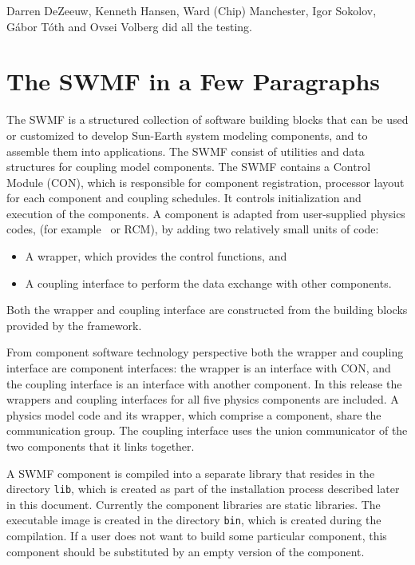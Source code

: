 Darren DeZeeuw, Kenneth Hansen, Ward (Chip) Manchester, Igor Sokolov,
G\'abor T\'oth and Ovsei Volberg did all the testing.


\section{The SWMF in a Few Paragraphs}


The SWMF is a structured collection of software building blocks that
can be used or customized to develop Sun-Earth system modeling
components, and to assemble them into applications. The SWMF consist
of utilities and data structures for coupling model components. The
SWMF contains a Control Module (CON), which is responsible for
component registration, processor layout for each component and
coupling schedules.  It controls initialization and execution of the
components. A component is adapted from user-supplied physics codes,
(for example \BATSRUS\ or RCM), by adding two relatively small units
of code:

\begin{itemize}
\item A wrapper, which provides the control functions, and
\item A coupling interface to perform the data exchange with other
components.
\end{itemize}

Both the wrapper and coupling interface are constructed from the
building blocks provided by the framework.

From component software technology perspective both the wrapper and
coupling interface are component interfaces: the wrapper is an
interface with CON, and the coupling interface is an interface with
another component. In this release the wrappers and coupling
interfaces for all five physics components are included. A physics
model code and its wrapper, which comprise a component, share the
communication group.  The coupling interface uses the union
communicator of the two components that it links together.

A SWMF component is compiled into a separate library that resides in
the directory {\tt lib}, which is created as part of the installation
process described later in this document.  Currently the component
libraries are static libraries. The executable image is created in the
directory {\tt bin}, which is created during the compilation.  If a
user does not want to build some particular component, this component
should be substituted by an empty version of the component.

